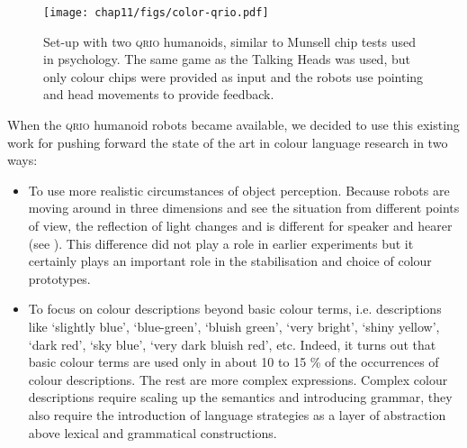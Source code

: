 \begin{figure}[htbp]
  \centerline{\texttt{[image: chap11/figs/color-qrio.pdf]}}
\caption{\label{fig:munsell}Set-up with two \textsc{qrio} humanoids, similar to Munsell chip tests used in psychology. The same game as the Talking 
Heads was used, but only colour chips were provided as input and the robots use pointing and head movements to 
provide feedback.}
\end{figure}

When the \textsc{qrio} humanoid robots became available, we decided to use this existing work for pushing forward the state of 
the art in colour language research in two ways:
\begin{itemize}
\item To use more realistic circumstances of object perception. Because 
robots are moving around in three dimensions and see the situation from different points of view, the reflection 
of light changes and is different for speaker and hearer (see ). This difference did not 
play a role in earlier experiments but 
it certainly plays an important role in the stabilisation and choice of colour prototypes. 
\item To focus on colour descriptions beyond basic colour terms, i.e. descriptions like 
`slightly blue', `blue-green', `bluish green', `very bright', `shiny yellow', `dark red', `sky blue', 
`very dark bluish red', etc. Indeed, it turns out that 
basic colour terms are used only in about 10 to 15 \% of the occurrences of colour descriptions. The rest are 
more complex expressions. Complex colour descriptions require scaling up the semantics and introducing grammar, they 
also require the introduction of language strategies as a layer of abstraction 
above lexical and grammatical constructions. 
\end{itemize}


